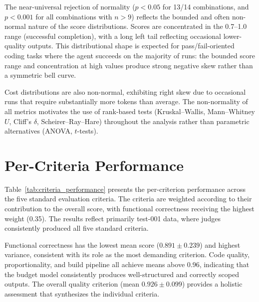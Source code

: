 \documentclass[11pt]{article}
\begin{document}


The near-universal rejection of normality ($p < 0.05$ for 13/14 combinations,
and $p < 0.001$ for all combinations with $n > 9$) reflects the bounded and often
non-normal nature of the score distributions. Scores are concentrated in the
0.7--1.0 range (successful completion), with a long left tail reflecting
occasional lower-quality outputs. This distributional shape is expected
for pass/fail-oriented coding tasks where the agent succeeds on the majority
of runs: the bounded score range and concentration at high values produce
strong negative skew rather than a symmetric bell curve.

Cost distributions are also non-normal, exhibiting right skew due to
occasional runs that require substantially more tokens than average. The
non-normality of all metrics motivates the use of rank-based tests
(Kruskal--Wallis, Mann--Whitney $U$, Cliff's $\delta$, Scheirer--Ray--Hare) throughout
the analysis rather than parametric alternatives (ANOVA, $t$-tests).

\section{Per-Criteria Performance}
\label{app:criteria_performance}

Table~\ref{tab:criteria_performance} presents the per-criterion performance
across the five standard evaluation criteria. The criteria are weighted
according to their contribution to the overall score, with functional
correctness receiving the highest weight (0.35). The results reflect
primarily test-001 data, where judges consistently produced all five
standard criteria.



Functional correctness has the lowest mean score ($0.891 \pm 0.239$) and
highest variance, consistent with its role as the most demanding criterion.
Code quality, proportionality, and build pipeline all achieve means above
0.96, indicating that the budget model consistently produces well-structured
and correctly scoped outputs. The overall quality criterion (mean $0.926 \pm
0.099$) provides a holistic assessment that synthesizes the individual
criteria.

\end{document}
